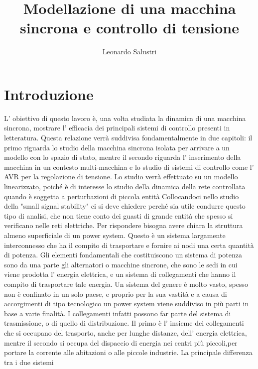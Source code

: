 \documentclass[Lau,noexaminfo]{sapthesis}
\title{Modellazione di una macchina sincrona e controllo di tensione}
\author{Leonardo Salustri}
\begin{document}
	\frontmatter
	\maketitle
	\dedication{Grazie}
	
	\tableofcontents
	
	\setcounter{secnumdepth}{1}
	\setcounter{tocdepth}{1}
	\mainmatter
	\section*{Introduzione}
	L' obiettivo di questo lavoro è, una volta studiata la dinamica di una macchina sincrona, mostrare l' efficacia dei principali sistemi di controllo presenti in letteratura.
	Questa relazione verrà suddivisa fondamentalmente in due capitoli: il primo riguarda lo studio della macchina sincrona isolata per arrivare a un modello con lo spazio di stato, mentre il
	secondo riguarda l' inserimento della macchina in un contesto multi-macchina e lo studio di sistemi di controllo come l' AVR per la regolazione di tensione.
	Lo studio verrà effettuato su un modello linearizzato, poiché è di interesse lo studio della dinamica della rete controllata quando è soggetta a perturbazioni di piccola entità
	Collocandoci nello studio della "small signal stability" ci si deve chiedere perché sia utile condurre questo tipo di analisi, che non tiene conto dei guasti di 
	grande entità che spesso si verificano nelle reti elettriche. Per rispondere bisogna avere chiara la struttura almeno superficiale di un power system.
	Questo è un sistema largamente interconnesso che ha il compito di trasportare e fornire ai nodi una certa quantità di potenza. Gli elementi fondamentali che costituiscono
	un sistema di potenza sono da una parte gli alternatori o macchine sincrone, che sono le sedi in cui viene prodotta l' energia elettrica, e un sistema di collegamenti
	che hanno il compito di trasportare tale energia. Un sistema del genere è molto vasto, spesso non è confinato in un solo paese, e proprio per la sua vastità e a causa di
	accorgimenti di tipo tecnologico un power system viene suddiviso in più parti in base a varie finalità. I collegamenti infatti possono far parte del sistema di trasmissione,
	o di quello di distribuzione. Il primo è l' insieme dei collegamenti che si occupano del trasporto, anche per lunghe distanze, dell' energia elettrica, mentre il secondo
	si occupa del dispaccio di energia nei centri più piccoli,per portare la corrente alle abitazioni o alle piccole industrie. La principale differenza tra i due sistemi
\end{document}
